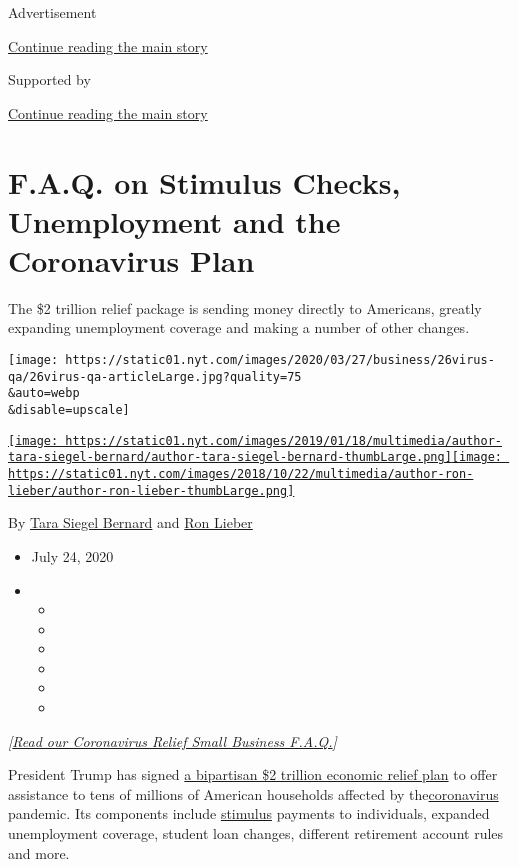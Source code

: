 Advertisement

\protect\hyperlink{after-top}{Continue reading the main story}

Supported by

\protect\hyperlink{after-sponsor}{Continue reading the main story}

\hypertarget{faq-on-stimulus-checks-unemployment-and-the-coronavirus-plan}{%
\section{F.A.Q. on Stimulus Checks, Unemployment and the Coronavirus
Plan}\label{faq-on-stimulus-checks-unemployment-and-the-coronavirus-plan}}

The \$2 trillion relief package is sending money directly to Americans,
greatly expanding unemployment coverage and making a number of other
changes.

\texttt{[image: https://static01.nyt.com/images/2020/03/27/business/26virus-qa/26virus-qa-articleLarge.jpg?quality=75\\\&auto=webp\\\&disable=upscale]}

\href{https://www.nytimes.com/by/tara-siegel-bernard}{\texttt{[image: https://static01.nyt.com/images/2019/01/18/multimedia/author-tara-siegel-bernard/author-tara-siegel-bernard-thumbLarge.png]}}\href{https://www.nytimes.com/by/ron-lieber}{\texttt{[image: https://static01.nyt.com/images/2018/10/22/multimedia/author-ron-lieber/author-ron-lieber-thumbLarge.png]}}

By \href{https://www.nytimes.com/by/tara-siegel-bernard}{Tara Siegel
Bernard} and \href{https://www.nytimes.com/by/ron-lieber}{Ron Lieber}

\begin{itemize}
\item
  July 24, 2020
\item
  \begin{itemize}
  \item
  \item
  \item
  \item
  \item
  \item
  \end{itemize}
\end{itemize}

\emph{{[}}\href{https://www.nytimes.com/article/small-business-loans-stimulus-grants-freelancers-coronavirus.html}{\emph{Read
our Coronavirus Relief Small Business F.A.Q.}}\emph{{]}}

President Trump has signed
\href{https://www.nytimes.com/2020/03/26/us/coronavirus-senate-stimulus-package.html}{a
bipartisan \$2 trillion economic relief plan} to offer assistance to
tens of millions of American households affected by
the\href{https://www.nytimes.com/interactive/2020/07/24/business/economy/600-unemployment-benefits.html}{coronavirus}
pandemic. Its components include
\href{https://www.nytimes.com/interactive/2020/07/24/business/economy/600-unemployment-benefits.html}{stimulus}
payments to individuals, expanded unemployment coverage, student loan
changes, different retirement account rules and more.

